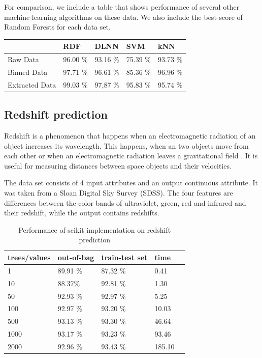 \documentclass[thesis=B,english]{FITthesis}[2012/10/20]
\begin{document}
For comparison, we include a table that shows performance of several other machine learning algorithms on these data. We also include the best score of Random Forests for each data set.

\begin{table}
    \begin{tabular}{|l|l|l|l|l|}
    \hline
    ~              & RDF       & DLNN       & SVM      & kNN      \\ \hline
    Raw Data       & 96.00 \%  & 93.16 \%   & 75.39 \% & 93.73 \% \\ \hline
    Binned Data    & 97.71 \%  & 96.61 \%   & 85.36 \% & 96.96 \% \\ \hline
    Extracted Data & 99.03 \%  & 97,87 \% & 95.83 \% & 95.74 \% \\ \hline
    \end{tabular}
\end{table}

\subsection{Redshift prediction}
Redshift is a phenomenon that happens when an electromagnetic radiation of an object increases its wavelength. This happens, when an two objects move from each other or when an electromagnetic radiation leaves a gravitational field \cite{}. It is useful for measuring distances between space objects and their velocities. 

The data set consists of 4 input attributes and an output continuous attribute. It was taken from a Sloan Digital Sky Survey (SDSS).  The four features are differences between the color bands of ultraviolet, green, red and infrared and their redshift, while the output contains redshifts.
\begin{table}[h]
\begin{tabular}{|l|l|l|l|l|}
\hline
trees/values & out-of-bag & train-test set & time \\ \hline
1            &89.91 \%                   &87.32 \%                & 0.41          \\ \hline
10           &88.37\%                    &92.81 \%                &1.30           \\ \hline
50           &92.93 \%                   &92.97 \%                &5.25        \\ \hline
100          &92.97 \%                   &93.20 \%                &10.03        \\ \hline
500          &93.13 \%                   &93.30 \%                &46.64      \\ \hline
1000         &93.17 \%                   &93.23 \%                &93.46         \\ \hline
2000         &92.96 \%                   &93.43 \%                &185.10        \\ \hline
\end{tabular}
\caption{Performance of scikit implementation on redshift prediction}
\label{tab:scikit-redshift}
\end{table}
\end{document}
